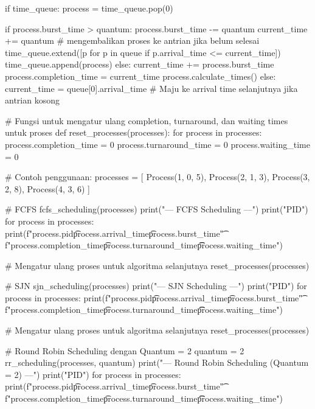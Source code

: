 \documentclass[12pt]{article}
\begin{document}
\begin{python}
        if time_queue:
            process = time_queue.pop(0)
            
            if process.burst_time > quantum:
                process.burst_time -= quantum
                current_time += quantum
                # mengembalikan proses ke antrian jika belum selesai
                time_queue.extend([p for p in queue if p.arrival_time <= current_time])
                time_queue.append(process)
            else:
                current_time += process.burst_time
                process.completion_time = current_time
                process.calculate_times()
        else:
            current_time = queue[0].arrival_time  # Maju ke arrival time selanjutnya jika antrian kosong

# Fungsi untuk mengatur ulang completion, turnaround, dan waiting times untuk proses
def reset_processes(processes):
    for process in processes:
        process.completion_time = 0
        process.turnaround_time = 0
        process.waiting_time = 0

# Contoh penggunaan:
processes = [
    Process(1, 0, 5),
    Process(2, 1, 3),
    Process(3, 2, 8),
    Process(4, 3, 6)
]

# FCFS
fcfs_scheduling(processes)
print("\n--- FCFS Scheduling ---")
print("PID\tArrival\tBurst\tCompletion\tTurnaround\tWaiting")
for process in processes:
    print(f"{process.pid}\t{process.arrival_time}\t{process.burst_time}\t"
          f"{process.completion_time}\t{process.turnaround_time}\t\t{process.waiting_time}")

# Mengatur ulang proses untuk algoritma selanjutnya
reset_processes(processes)

# SJN
sjn_scheduling(processes)
print("\n--- SJN Scheduling ---")
print("PID\tArrival\tBurst\tCompletion\tTurnaround\tWaiting")
for process in processes:
    print(f"{process.pid}\t{process.arrival_time}\t{process.burst_time}\t"
          f"{process.completion_time}\t{process.turnaround_time}\t\t{process.waiting_time}")

# Mengatur ulang proses untuk algoritma selanjutnya
reset_processes(processes)

# Round Robin Scheduling dengan Quantum = 2
quantum = 2
rr_scheduling(processes, quantum)
print("\n--- Round Robin Scheduling (Quantum = 2) ---")
print("PID\tArrival\tBurst\tCompletion\tTurnaround\tWaiting")
for process in processes:
    print(f"{process.pid}\t{process.arrival_time}\t{process.burst_time}\t"
          f"{process.completion_time}\t{process.turnaround_time}\t\t{process.waiting_time}")
\end{python}
\end{document}
